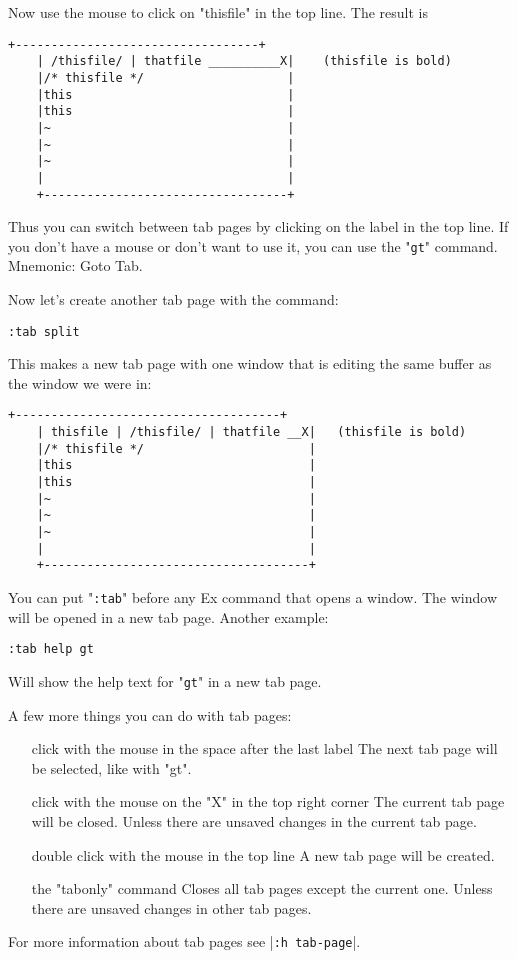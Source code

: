Now use the mouse to click on "thisfile" in the top line.
The result is

		\begin{Verbatim}[samepage=true]
    +----------------------------------+
    | /thisfile/ | thatfile __________X|    (thisfile is bold)
    |/* thisfile */                    |
    |this                              |
    |this                              |
    |~                                 |
    |~                                 |
    |~                                 |
    |                                  |
    +----------------------------------+
						\end{Verbatim}

Thus you can switch between tab pages by clicking on the label in the top line.
If you don't have a mouse or don't want to use it, you can use the "\verb!gt!" command.
Mnemonic: Goto Tab.

Now let's create another tab page with the command:

 \begin{Verbatim}[samepage=true]
 :tab split
 \end{Verbatim}

This makes a new tab page with one window that is editing the same buffer as the window we were in:

\begin{Verbatim}[samepage=true]
    +-------------------------------------+
    | thisfile | /thisfile/ | thatfile __X|   (thisfile is bold)
    |/* thisfile */                       |
    |this                                 |
    |this                                 |
    |~                                    |
    |~                                    |
    |~                                    |
    |                                     |
    +-------------------------------------+
\end{Verbatim}

You can put "\verb!:tab!" before any Ex command that opens a window.
The window will be opened in a new tab page.
Another example:

 \begin{Verbatim}[samepage=true]
 :tab help gt
 \end{Verbatim}

Will show the help text for "\verb!gt!" in a new tab page.

A few more things you can do with tab pages:
\begin{itemize}
	\item [click with the mouse in the space after the last label] The next tab page will be selected, like with "gt".
	\item [click with the mouse on the "X" in the top right corner] The current tab page will be closed.
								Unless there are unsaved changes in the current tab page.
							\item [double click with the mouse in the top line] A new tab page will be created.
							\item [the "tabonly" command] Closes all tab pages except the current one.
								Unless there are unsaved changes in other tab pages.
\end{itemize}
For more information about tab pages see |\verb!:h tab-page!|.
\clearpage

